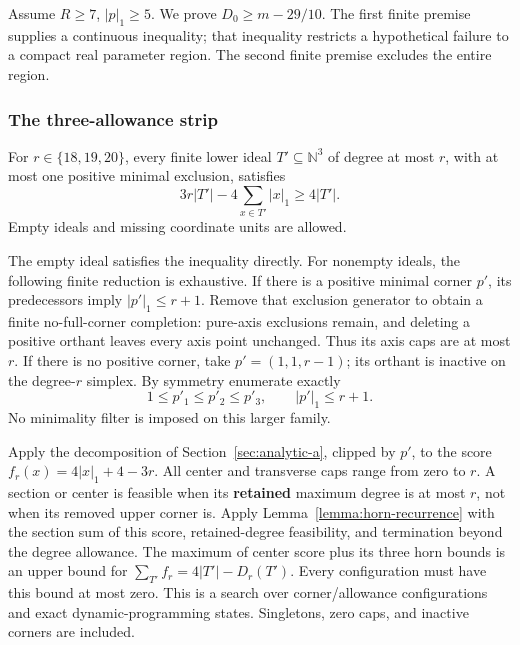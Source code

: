 Assume \(R\ge7\), \(|p|_1\ge5\). We prove \(D_0\ge m-29/10\).
The first finite premise supplies a continuous inequality; that inequality
restricts a hypothetical failure to a compact real parameter region.
The second finite premise excludes the entire region.

\subsubsection{The three-allowance strip}

\begin{finitelemma}[Strip]\label{finite:strip}
For \(r\in\{18,19,20\}\), every finite lower
ideal \(T'\subseteq\mathbb N^3\) of degree at most \(r\), with at most
one positive minimal exclusion, satisfies
\begin{equation}
3r|T'|-4\sum_{x\in T'}|x|_1\ge4|T'|.
\label{eq:p:22}
\end{equation}
Empty ideals and missing coordinate units are allowed.

\end{finitelemma}

The empty ideal satisfies the inequality directly. For nonempty ideals,
the following finite reduction is exhaustive. If there is a positive minimal
corner \(p'\), its predecessors imply \(|p'|_1\le r+1\).
Remove that exclusion generator to obtain a finite no-full-corner completion:
pure-axis exclusions remain, and deleting a positive orthant leaves every
axis point unchanged. Thus its axis caps are at most \(r\).
If there is no positive corner, take \(p'=(1,1,r-1)\); its orthant is
inactive on the degree-\(r\) simplex.
By symmetry enumerate exactly
\[
1\le p'_1\le p'_2\le p'_3,\qquad |p'|_1\le r+1.
\]
No minimality filter is imposed on this larger family.

Apply the decomposition of Section~\ref{sec:analytic-a}, clipped by \(p'\), to the score
\(f_r(x)=4|x|_1+4-3r\). All center and transverse caps range from zero
to \(r\). A section or center is feasible when its \textbf{retained}
maximum degree is at most \(r\), not when its removed upper corner is.
Apply Lemma~\ref{lemma:horn-recurrence} with the section sum of this
score, retained-degree feasibility, and termination beyond the degree
allowance.
The maximum of center score plus its three horn bounds is an upper bound
for \(\sum_{T'}f_r=4|T'|-D_r(T')\). Every configuration must have this
bound at most zero. This is a search over corner/allowance configurations
and exact dynamic-programming states.
Singletons, zero caps, and inactive corners are included.

